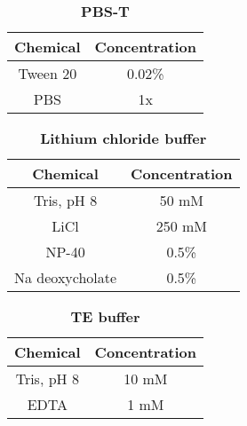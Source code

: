\documentclass[11pt,twoside,a4paper]{report}
\begin{document}
			   	 \begin{table}[H]
       			\caption{\bf{PBS-T}}
	        		\begin{center}
    		        		\begin{tabular}{|c|c|}
        		        		\hline
	    	    		        \textbf{Chemical} & \textbf{Concentration}\\
    		        		    \hline
	    	    		        Tween 20 & 0.02\%\\
    		        		    \hline
	    	    		        PBS & 1x\\
    		        		    \hline
		            \end{tabular}
    			    \end{center}
			    \end{table}
			    
			    \begin{table}[H]
       			\caption{\bf{Lithium chloride buffer}}
	        		\begin{center}
    		        		\begin{tabular}{|c|c|}
        		        		\hline
	    	    		        \textbf{Chemical} & \textbf{Concentration}\\
    		        		    \hline
	    	    		        Tris, pH 8 & 50 mM\\
    		        		    \hline
	    	    		        LiCl & 250 mM\\
    		        		    \hline
	    	    		        NP-40 & 0.5\%\\
    		        		    \hline
								Na deoxycholate & 0.5\%\\
								\hline
		            \end{tabular}
    			    \end{center}
			    \end{table}
			    
			     \begin{table}[H]
       			\caption{\bf{TE buffer}}
	        		\begin{center}
    		        		\begin{tabular}{|c|c|}
        		        		\hline
	    	    		        \textbf{Chemical} & \textbf{Concentration}\\
    		        		    \hline
	    	    		        Tris, pH 8 & 10 mM\\
    		        		    \hline
	    	    		        EDTA & 1 mM\\
	    	    		        \hline
		            \end{tabular}
    			    \end{center}
			    \end{table}
			    
\end{document}
